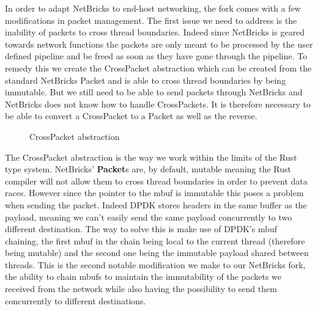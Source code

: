 In order to adapt NetBricks to end-host networking, the fork comes
with a few modifications in packet management. The first issue we need
to address is the inability of packets to cross thread
boundaries. Indeed since NetBricks is geared towards network functions
the packets are only meant to be processed by the user defined
pipeline and be freed as soon as they have gone through the
pipeline. To remedy this we create the CrossPacket abstraction which
can be created from the standard NetBricks Packet and is able to cross
thread boundaries by being immutable. But we still need to be able to
send packets through NetBricks and NetBricks does not know how to
handle CrossPackets. It is therefore necessary to be able to convert a
CrossPacket to a Packet as well as the reverse.

\begin{figure}[htb!]
  
  \caption{CrossPacket abstraction}
  \label{code:crosspacket}
\end{figure}

The CrossPacket abstraction is the way we work within the limits of
the Rust type system. NetBricks' \textbf{Packet}s are, by default,
mutable meaning the Rust compiler will not allow them to cross thread
boundaries in order to prevent data races. However since the
pointer to the mbuf is immutable this poses a problem when sending the
packet. Indeed DPDK stores headers in the same buffer as the payload,
meaning we can't easily send the same payload concurrently to two
different destination. The way to solve this is make use of DPDK's
mbuf chaining, the first mbuf in the chain being local to the current
thread (therefore being mutable) and the second one being the
immutable payload shared between threads. This is the second notable
modification we make to our NetBricks fork, the ability to chain mbufs
to maintain the immutability of the packets we received from the
network while also having the possibility to send them concurrently to
different destinations.

